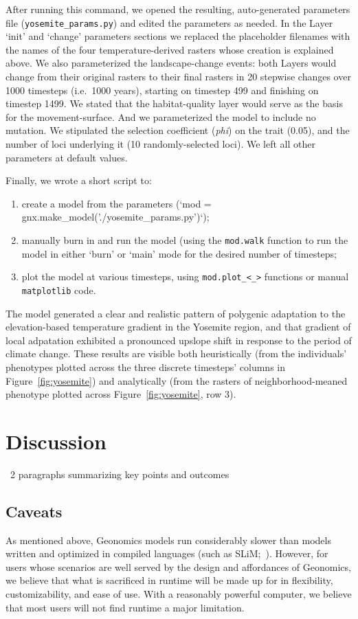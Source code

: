 ﻿\documentclass{article}
\begin{document}
After running this command, we opened the resulting, auto-generated parameters
file (\texttt{yosemite\_params.py}) and edited the parameters as needed.
In the Layer `init' and `change' parameters sections we replaced
the placeholder filenames with the names of the four temperature-derived
rasters whose creation is explained above.
We also parameterized the landscape-change events:
both Layers would change from their original rasters to their final
rasters in 20 stepwise changes over 1000 timesteps (i.e.\ 1000 years),
starting on timestep 499 and finishing on timestep 1499.
We stated that the habitat-quality layer would serve as the basis for the movement-surface.
And we parameterized the model to include no mutation.
We stipulated the selection coefficient (\emph{phi}) on the trait (0.05),
and the number of loci underlying it (10 randomly-selected loci).
We left all other parameters at default values.

Finally, we wrote a short script to:
\begin{enumerate}
  \item create a model from the parameters (`mod = gnx.make\_model('./yosemite\_params.py')`);
  \item manually burn in and run the model (using the \texttt{mod.walk} function to run the model
in either `burn' or `main' mode for the desired number of timesteps;
  \item plot the model at various timesteps, using \texttt{mod.plot\_<\_>} functions or manual \texttt{matplotlib} code.
\end{enumerate}

The model generated a clear and realistic pattern of polygenic adaptation to
the elevation-based temperature gradient in the Yosemite region, and that
gradient of local adpatation exhibited a pronounced upslope shift in response to
the period of climate change. These results are visible both heuristically
(from the individuals' phenotypes plotted across the three discrete timesteps' columns
in Figure~\ref{fig:yosemite})
and analytically (from the rasters of neighborhood-meaned phenotype plotted across
Figure~\ref{fig:yosemite}, row 3).


\section{Discussion}

\large{~2 paragraphs summarizing key points and outcomes}

\subsection{Caveats}
As mentioned above, Geonomics models run considerably slower than models
written and optimized in compiled languages (such as SLiM;~\cite{messer,haller}).
However, for users whose scenarios are well served by the design
and affordances of Geonomics, we believe that what is sacrificed in
runtime will be made up for in flexibility, customizability, and ease of use.
With a reasonably powerful computer, we believe that most users
will not find runtime a major limitation.
\end{document}
